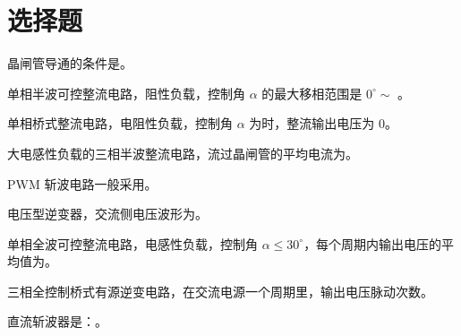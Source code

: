\documentclass[电力电子]{subfiles}
\begin{document}
\section{选择题}
\begin{ti}
	晶闸管导通的条件是。
\end{ti}

\begin{ti}
	单相半波可控整流电路，阻性负载，控制角 $\alpha$ 的最大移相范围是 $0^\circ \sim $ 。
\end{ti}

\begin{ti}
	单相桥式整流电路，电阻性负载，控制角 $\alpha$ 为时，整流输出电压为 $0$。
\end{ti}

\begin{ti}
	大电感性负载的三相半波整流电路，流过晶闸管的平均电流为。
\end{ti}

\begin{ti}
	PWM 斩波电路一般采用。
\end{ti}

\begin{ti}
	电压型逆变器，交流侧电压波形为。
\end{ti}

\begin{ti}
	单相全波可控整流电路，电感性负载，控制角 $\alpha \leq 30^\circ$，每个周期内输出电压的平均值为。
\end{ti}

\begin{ti}
	三相全控制桥式有源逆变电路，在交流电源一个周期里，输出电压脉动次数。
\end{ti}

\begin{ti}
	直流斩波器是：。
\end{ti}
\end{document}

